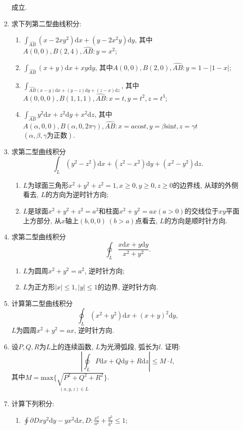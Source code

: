 \begin{enumerate}
成立.
\item 求下列第二型曲线积分:
\begin{enumerate}
	\item  $\displaystyle{\int_{\widehat{AB}}(x-2xy^2)\mathrm{d}x+(y-2x^2y)\mathrm{d}y}$, 其中$A(0,0), B(2,4), \widehat{AB}:y=x^2$;
	\item $\displaystyle{\int_{\widehat{AB}}(x+y)\mathrm{d}x+xy\mathrm{d}y}$, 其中$A(0,0), B(2,0), \widehat{AB}: y=1-|1-x|$;
	\item $\displaystyle{\int_{\widehat{AB}(x-y)\mathrm{d}x+(y-z)\mathrm{d}y+(z-x)\mathrm{d}z}}$, 其中$A(0,0,0), B(1,1,1), \widehat{AB}:x=t,y=t^2,z=t^3$;
	\item $\displaystyle{\int_{\widehat{AB}}y^2\mathrm{d}x+z^2\mathrm{d}y+x^2\mathrm{d}z}$, 其中$A(\alpha,0,0),B(\alpha,0,2\pi\gamma),\widehat{AB}: x=a\mathrm{cos}t, y=\beta\mathrm{sin}t,z=\gamma t$ $(\alpha,\beta,\gamma\text{为正数})$.
\end{enumerate}
\item 求第二型曲线积分
$$ \displaystyle{\int_{L}(y^2-z^2)\mathrm{d}x+(z^2-x^2)\mathrm{d}y+(x^2-y^2)\mathrm{d}z}.$$
\begin{enumerate}
	\item $L$为球面三角形$x^2+y^2+z^2=1, x\ge 0,y\ge 0,z\ge	0$的边界线, 从球的外侧看去, $L$的方向为逆时针方向;
	\item $L$是球面$x^2+y^2+z^2=a^2$和柱面$x^2+y^2=ax(a>0)$的交线位于$xy$平面上方部分, 从$x$轴上$(b,0,0)\ (b>a)$点看去, $L$的方向是顺时针方向.
\end{enumerate}
\item 求第二型曲线积分
$$ \displaystyle{\oint_{L}\frac{x\mathrm{d}x+y\mathrm{d}y}{x^2+y^2}}.$$
\begin{enumerate}
	\item $L$为圆周$x^2+y^2=a^2$, 逆时针方向;
	\item $L$为正方形$|x|\le 1,|y|\le 1$的边界, 逆时针方向.
\end{enumerate}
\item 计算第二型曲线积分
$$ \displaystyle{\oint_{L}(x^2+y^2)\mathrm{d}x+(x+y)^2\mathrm{d}y},$$
$L$为圆周$x^2+y^2=ax$, 逆时针方向.
\item 设$P, Q, R$为$L$上的连续函数, $L$为光滑弧段, 弧长为$l$. 证明:
$$ |\displaystyle{\oint_{L}P\mathrm{d}x+Q\mathrm{d}y+R\mathrm{d}z}| \le M\cdot l,$$
其中$M=\underset{(x,y,z)\in L}{\mathrm{max}\{\sqrt{P^2+Q^2+R^2}\}}$.
\item 计算下列积分:
\begin{enumerate}
	\item $\displaystyle{\oint{\partial D}xy^2\mathrm{d}y-yx^2\mathrm{d}x}, D: \frac{x^2}{a^2}+\frac{y^2}{b^2}\le 1$;

\end{enumerate}
\end{enumerate}
